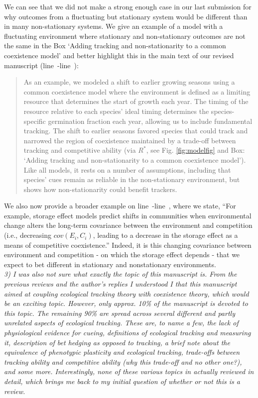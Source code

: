 \documentclass[11pt]{article}
\newcommand{\lr}[1]{line~\lineref{#1}}
\begin{document}
We can see that we did not make a strong enough case in our last submission for why outcomes from a fluctuating but stationary system would be different than in many non-stationary systems. We give an example of a model with a fluctuating environment where stationary and non-stationary outcomes are not the same in the Box `Adding tracking and non-stationarity to a common coexistence model' and better highlight this in the main text of our revised manuscript (\lr{r1dS1}-\lr{r1dE1}):
\begin{quote}
As an example, we modeled a shift to earlier growing seasons using a common coexistence model where the environment is defined as a limiting resource that determines the start of growth each year. The timing of the resource relative to each species' ideal timing determines the species-specific germination fraction each year, allowing us to include fundamental tracking. The shift to earlier seasons favored species that could track and narrowed the region of coexistence maintained by a trade-off between tracking and competitive ability (via $R^*$, see Fig. \ref{fig:modelfig} and Box: `Adding tracking and non-stationarity to a common coexistence model'). Like all models, it rests on a number of assumptions, including that species' cues remain as reliable in the non-stationary environment, but shows how non-stationarity could benefit trackers.
\end{quote}
We also now provide a broader example on \lr{r1dS}-\lr{r1dE}, where we state, ``For example, storage effect models predict shifts in communities when environmental change alters the long-term covariance between the environment and competition (i.e., decreasing $cov(E_i, C_i)$, leading to a decrease in the storage effect as a means of competitive coexistence.'' Indeed, it is this changing covariance between environment and competition - on which the storage effect depends - that we expect to bet different in stationary and nonstationary environments. \\

\emph{3) I was also not sure what exactly the topic of this manuscript is. From the previous
reviews and the author's replies I understood I that this manuscript aimed at coupling
ecological tracking theory with coexistence theory, which would be an exciting topic.
However, only approx. 10\% of the manuscript is devoted to this topic. The remaining 90\% are
spread across several different and partly unrelated aspects of ecological tracking. These
are, to name a few, the lack of physiological evidence for cueing, definitions of ecological
tracking and measuring it, description of bet hedging as opposed to tracking, a brief note
about the equivalence of phenotypic plasticity and ecological tracking, trade-offs between
tracking ability and competitive ability (why this trade-off and no other one?), and some
more. Interestingly, none of these various topics in actually reviewed in detail, which
brings me back to my initial question of whether or not this is a review.}\\
\end{document}
